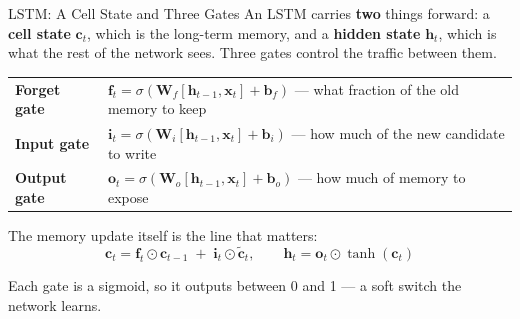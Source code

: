 \documentclass[aspectratio=169, 11pt]{beamer}
\begin{document}
\begin{frame}{LSTM: A Cell State and Three Gates \parencite{Hochreiter1997}}
  An LSTM carries \textbf{two} things forward: a \textbf{cell state} $\mathbf{c}_t$, which is the
  long-term memory, and a \textbf{hidden state} $\mathbf{h}_t$, which is what the rest of the
  network sees. Three gates control the traffic between them.
  \begin{center}
    {\small
    \begin{tabular}{p{2.3cm}p{10.2cm}}
      \toprule
      \textbf{Forget gate} & $\mathbf{f}_t = \sigma(\mathbf{W}_f[\mathbf{h}_{t-1}, \mathbf{x}_t] + \mathbf{b}_f)$
        --- what fraction of the old memory to keep \\[3pt]
      \textbf{Input gate} & $\mathbf{i}_t = \sigma(\mathbf{W}_i[\mathbf{h}_{t-1}, \mathbf{x}_t] + \mathbf{b}_i)$
        --- how much of the new candidate to write \\[3pt]
      \textbf{Output gate} & $\mathbf{o}_t = \sigma(\mathbf{W}_o[\mathbf{h}_{t-1}, \mathbf{x}_t] + \mathbf{b}_o)$
        --- how much of memory to expose \\
      \bottomrule
    \end{tabular}
    }
  \end{center}

  \vspace{-0.1cm}
  The memory update itself is the line that matters:
  \[
    \mathbf{c}_t = \mathbf{f}_t \odot \mathbf{c}_{t-1} \;+\; \mathbf{i}_t \odot \tilde{\mathbf{c}}_t,
    \qquad
    \mathbf{h}_t = \mathbf{o}_t \odot \tanh(\mathbf{c}_t)
  \]
  \vspace{-0.3cm}

  Each gate is a sigmoid, so it outputs between 0 and 1 --- a soft switch the network learns.
\end{frame}
\end{document}
